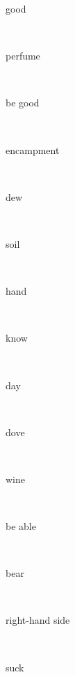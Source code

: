 \documentclass[a4paper]{article}
\begin{document}
\begin{multicols}{4}
\begin{multicols}{4}
\begin{multicols}{5}
{\hebrewfont{}} \begin{english}good\end{english}\\
{\hebrewfont{}} \begin{english}perfume\end{english}\\
{\hebrewfont{}} \begin{english}be good\end{english}\\
{\hebrewfont{}} \begin{english}encampment\end{english}\\
{\hebrewfont{}} \begin{english}dew\end{english}\\
{\hebrewfont{}} \begin{english}soil\end{english}\\
{\hebrewfont{}} \begin{english}hand\end{english}\\
{\hebrewfont{}} \begin{english}know\end{english}\\
{\hebrewfont{}} \begin{english}day\end{english}\\
{\hebrewfont{}} \begin{english}dove\end{english}\\
{\hebrewfont{}} \begin{english}wine\end{english}\\
{\hebrewfont{}} \begin{english}be able\end{english}\\
{\hebrewfont{}} \begin{english}bear\end{english}\\
{\hebrewfont{}} \begin{english}right-hand side\end{english}\\
{\hebrewfont{}} \begin{english}suck\end{english}\\

\end{multicols}
\end{multicols}
\end{multicols}
\end{document}
